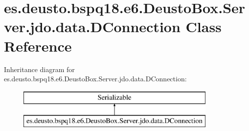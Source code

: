 \hypertarget{classes_1_1deusto_1_1bspq18_1_1e6_1_1_deusto_box_1_1_server_1_1jdo_1_1data_1_1_d_connection}{}\section{es.\+deusto.\+bspq18.\+e6.\+Deusto\+Box.\+Server.\+jdo.\+data.\+D\+Connection Class Reference}
\label{classes_1_1deusto_1_1bspq18_1_1e6_1_1_deusto_box_1_1_server_1_1jdo_1_1data_1_1_d_connection}
Inheritance diagram for es.\+deusto.\+bspq18.\+e6.\+Deusto\+Box.\+Server.\+jdo.\+data.\+D\+Connection\+:\begin{figure}[H]
\begin{center}
\leavevmode
\includegraphics[height=2.000000cm]{classes_1_1deusto_1_1bspq18_1_1e6_1_1_deusto_box_1_1_server_1_1jdo_1_1data_1_1_d_connection}
\end{center}
\end{figure}
